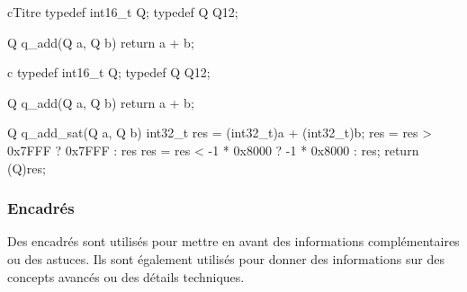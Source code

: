 \documentclass[11pt,a4paper,twoside]{book}
\begin{document}
\begin{code}{c}{Titre}{}
typedef int16_t Q;
typedef Q Q12;

Q q_add(Q a, Q b) {
    return a + b;
}\end{code}

\begin{code}{c}{}{}
typedef int16_t Q;
typedef Q Q12;

Q q_add(Q a, Q b) {
    return a + b;
}

Q q_add_sat(Q a, Q b) {
    int32_t res = (int32_t)a + (int32_t)b;
    res = res > 0x7FFF ? 0x7FFF : res
    res = res < -1 * 0x8000 ? -1 * 0x8000 : res;
    return (Q)res;
}
\end{code}

\subsubsection{Encadrés}

Des encadrés sont utilisés pour mettre en avant des informations complémentaires ou des astuces. Ils sont également utilisés pour donner des informations sur des concepts avancés ou des détails techniques.
\end{document}
